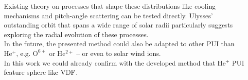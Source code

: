 Existing theory on processes that shape these distributions like cooling mechanisms and pitch-angle scattering can be tested directly.
Ulysses' outstanding orbit that spans a wide range of solar radii particularly suggests exploring the radial evolution of these processes.\\
In the future, the presented method could also be adapted to other PUI than $\mathrm{He^+}$, e.g. $\mathrm{O^{6+}}$ or $\mathrm{He^{2+}}$  -- or even to solar wind ions. \\
In this work we could already confirm with the developed method that $\mathrm{He^+}$ PUI feature sphere-like VDF.
%
%
%



